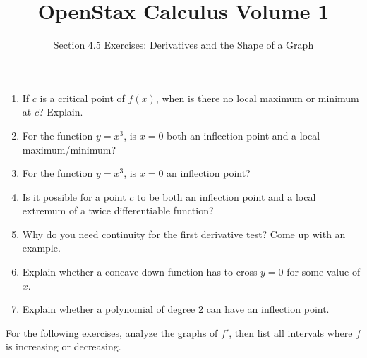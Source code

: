 \documentclass{exercises}
\title{OpenStax Calculus Volume 1}
\subtitle{Section 4.5 Exercises: Derivatives and the Shape of a Graph}
\author{}
\date{}
\begin{document}
\maketitle

\begin{enumerate}[start=1]
\item If $c$ is a critical point of $f(x)$, when is there no local maximum or minimum at $c$? Explain.
\item For the function $y=x^{3}$, is $x=0$ both an inflection point and a local maximum/minimum?
\item For the function $y=x^{3}$, is $x=0$ an inflection point?
\item Is it possible for a point $c$ to be both an inflection point and a local extremum of a twice differentiable function?
\item Why do you need continuity for the first derivative test? Come up with an example.
\item Explain whether a concave-down function has to cross $y=0$ for some value of $x$.
\item Explain whether a polynomial of degree $2$ can have an inflection point.
\end{enumerate}

For the following exercises, analyze the graphs of $f'$, then list all intervals where $f$ is increasing or decreasing.
\end{document}
